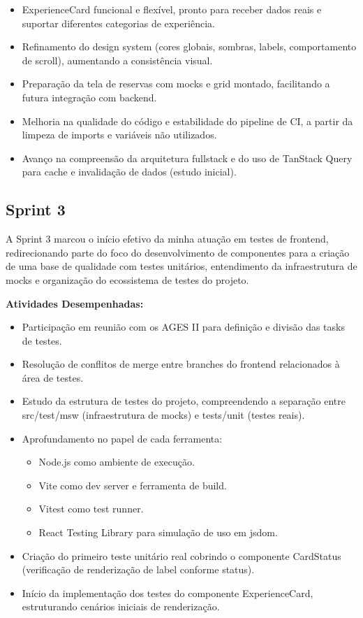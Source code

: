 \begin{itemize}
\item
  ExperienceCard funcional e flexível, pronto para receber dados reais e
  suportar diferentes categorias de experiência.
\item
  Refinamento do design system (cores globais, sombras, labels,
  comportamento de scroll), aumentando a consistência visual.
\item
  Preparação da tela de reservas com mocks e grid montado, facilitando a
  futura integração com backend.
\item
  Melhoria na qualidade do código e estabilidade do pipeline de CI, a
  partir da limpeza de imports e variáveis não utilizados.
\item
  Avanço na compreensão da arquitetura fullstack e do uso de TanStack
  Query para cache e invalidação de dados (estudo inicial).
\end{itemize}

\subsection{Sprint 3}

A Sprint 3 marcou o início efetivo da minha atuação em testes de
frontend, redirecionando parte do foco do desenvolvimento de componentes
para a criação de uma base de qualidade com testes unitários,
entendimento da infraestrutura de mocks e organização do ecossistema de
testes do projeto.

\textbf{Atividades Desempenhadas:}

\begin{itemize}
\item
  Participação em reunião com os AGES II para definição e divisão das
  tasks de testes.
\item
  Resolução de conflitos de merge entre branches do frontend
  relacionados à área de testes.
\item
  Estudo da estrutura de testes do projeto, compreendendo a separação
  entre src/test/msw (infraestrutura de mocks) e tests/unit (testes
  reais).
\item
  Aprofundamento no papel de cada ferramenta:

  \begin{itemize}
  \item
    Node.js como ambiente de execução.
  \item
    Vite como dev server e ferramenta de build.
  \item
    Vitest como test runner.
  \item
    React Testing Library para simulação de uso em jsdom.
  \end{itemize}
\item
  Criação do primeiro teste unitário real cobrindo o componente
  CardStatus (verificação de renderização de label conforme status).
\item
  Início da implementação dos testes do componente ExperienceCard,
  estruturando cenários iniciais de renderização.
\end{itemize}

